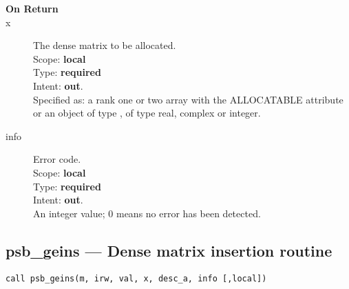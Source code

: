 \begin{description}
\item[\bf On Return]
\item[x] The dense matrix to be allocated.\\
Scope: {\bf local} \\
Type: {\bf required}\\
Intent: {\bf out}.\\
Specified as: a rank one or two array with the ALLOCATABLE  attribute
or an object of type \vdata, of type real, complex or integer.\\ 
\item[info] Error code.\\
Scope: {\bf local} \\
Type: {\bf required} \\
Intent: {\bf out}.\\
An integer value; 0 means no error has been detected. 
\end{description}


%
%
\clearpage\subsection{psb\_geins --- Dense matrix insertion routine}

\begin{verbatim}
call psb_geins(m, irw, val, x, desc_a, info [,local])
\end{verbatim}

